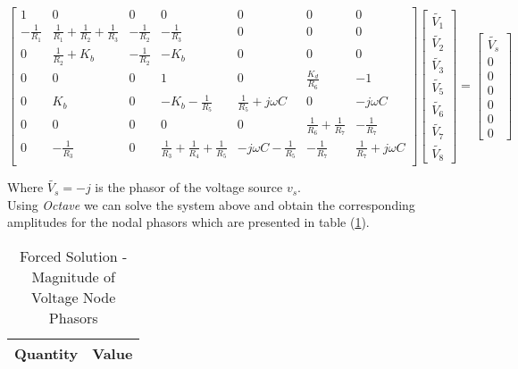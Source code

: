 \begin{equation}
  \begin{bmatrix}
    1 & 0 & 0 & 0 & 0 & 0 & 0\\
    -\frac{1}{R_1} & \frac{1}{R_1} + \frac{1}{R_2} + \frac{1}{R_3} & - \frac{1}{R_2} & -\frac{1}{R_3} & 0 & 0 & 0\\
    0 & \frac{1}{R_2} + K_b & -\frac{1}{R_2} & -K_b & 0 & 0 & 0\\
    0 & 0 & 0 & 1 & 0 & \frac{K_d}{R_6} & - 1\\
    0 & K_b & 0 & -K_b - \frac{1}{R_5} & \frac{1}{R_5} + j \omega C & 0 & - j \omega C\\
    0 & 0 & 0 & 0 & 0 & \frac{1}{R_6} + \frac{1}{R_7} & -\frac{1}{R_7} \\ 
    0 & -\frac{1}{R_3} & 0 & \frac{1}{R_3} + \frac{1}{R_4} + \frac{1}{R_5} & - j \omega C - \frac{1}{R_5} & -\frac{1}{R_7} & \frac{1}{R_7} + j \omega C \\
  \end{bmatrix}
  \begin{bmatrix}
    \widetilde{V_1}\\
    \widetilde{V_2}\\
    \widetilde{V_3}\\
    \widetilde{V_5}\\
    \widetilde{V_6}\\
    \widetilde{V_7}\\
    \widetilde{V_8}

  \end{bmatrix}
  =
  \begin{bmatrix}
    \widetilde{V_s}\\
    0\\
    0\\
    0\\
    0\\
    0\\
    0
  \end{bmatrix}
\end{equation}

Where $\widetilde{V_s} = - j$ is the phasor of the voltage source $v_s$.
\\
Using \emph{Octave} we can solve the system above and obtain the corresponding amplitudes for the nodal phasors which
are presented in table (\ref{tab:Teo3}).

\begin{table}[H]
    \centering
    \begin{tabular}{|l|r|}
    \hline    
    {\bf Quantity} & {\bf Value} \\ \hline
    
    \end{tabular}
    \caption{Forced Solution - Magnitude of Voltage Node Phasors}
    \label{tab:Teo3}
\end{table} 

